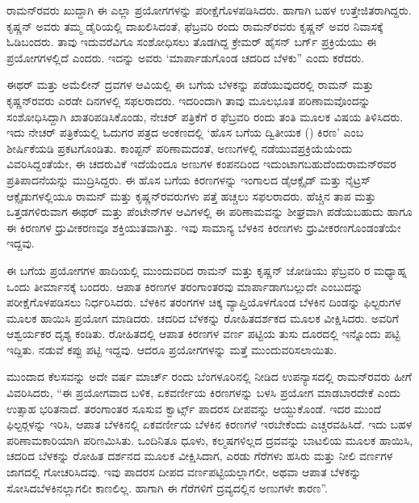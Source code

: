ರಾಮನ್‍ರವರು ಖುದ್ದಾಗಿ ಈ ಎಲ್ಲಾ ಪ್ರಯೋಗಗಳನ್ನು ಪರೀಕ್ಷೆಗೊಳಪಡಿಸಿದರು. ಹಾಗಾಗಿ ಬಹಳ ಉತ್ತೇಜಿತರಾಗಿದ್ದರು. ಕೃಷ್ಣನ್ ಅವರು ತಮ್ಮ ಡೈರಿಯಲ್ಲಿ ದಾಖಲಿಸಿದಂತೆ, ಫೆಬ್ರವರಿ  ರಂದು ರಾಮನ್‍ರವರು ಕೃಷ್ಣನ್ ಅವರ ನಿವಾಸಕ್ಕೆ ಓಡಿಬಂದರು. ತಾವು ಇದುವರೆವಿಗೂ ಸಂಶೋಧಿಸಲು ತೊಡಗಿದ್ದ ಕ್ರೇಮರ್ ಹೈಸನ್ ಬರ್ಗ್ ಪ್ರಕ್ರಿಯೆಯು ಈ ಪ್ರಯೋಗಗಳಲ್ಲಿದೆ ಎಂದರು. ಇದನ್ನು ಅವರು ‘ಮಾರ್ಪಾಡುಗೊಂಡ ಚದರಿದ ಬೆಳಕು” ಎಂದು ಕರೆದರು.

ಈಥರ್ ಮತ್ತು ಅಮೆಲೀನ್ ದ್ರವಗಳ ಆವಿಯಲ್ಲಿ ಈ ಬಗೆಯ ಬೆಳಕನ್ನು ಪಡೆಯುವುದರಲ್ಲಿ ರಾಮನ್ ಮತ್ತು ಕೃಷ್ಣನ್‍ರವರು ಎರಡೇ ದಿನಗಳಲ್ಲಿ ಸಫಲರಾದರು. ಇದರಿಂದಾಗಿ ತಾವು ಮೂಲಭೂತ ಪರಿಣಾಮವೊಂದನ್ನು ಸಂಶೋಧಿಸಿದ್ದಾಗಿ ಖಾತರಿಪಡಿಸಿಕೊಂಡು, ನೇಚರ್ ಪತ್ರಿಕೆಗೆ ರ ಫೆಬ್ರವರಿ ರಂದು ತಂತಿ ಮೂಲಕ ವಿಷಯ ತಿಳಿಸಿದರು. ಇದು ನೇಚರ್ ಪತ್ರಿಕೆಯಲ್ಲಿ ಓದುಗರ ಪತ್ರದ ಅಂಕಣದಲ್ಲಿ ‘ಹೊಸ ಬಗೆಯ ದ್ವಿತೀಯಕ () ಕಿರಣ’ ಎಂಬ ಶೀರ್ಷಿಕೆಯಡಿ ಪ್ರಕಟಗೊಂಡಿತು. ಕಾಂಪ್ಟನ್ ಪರಿಣಾಮದಂತೆ, ಅಣುಗಳಲ್ಲಿ ನಡೆಯುವ\break ಪ್ರಕ್ರಿಯೆಯೆಂದು ವಿವರಿಸಿದ್ದಂತೆಯೇ, ಈ ಚದರುವಿಕೆ ಇದೆಯೆಂದೂ ಅಣುಗಳ ಕಂಪನದಿಂದ ಇದುಂಟಾಗಬಹುದೆಂದು\enginline{-}ರಾಮನ್‍ರವರ ಪ್ರತಿಪಾದನೆಯನ್ನು ಮುದ್ರಿಸಿದ್ದರು. ಈ ಹೊಸ ಬಗೆಯ ಕಿರಣಗಳನ್ನು ಇಂಗಾಲದ ಡೈಆಕ್ಸೈಡ್ ಮತ್ತು ನೈಟ್ರಸ್ ಆಕ್ಸೈಡುಗಳಲ್ಲಿಯೂ ರಾಮನ್ ಮತ್ತು ಕೃಷ್ಣನ್‍ರವರುಗಳು ಪತ್ತೆ ಹಚ್ಚಲು ಸಫಲರಾದರು. ಹೆಚ್ಚಿನ ತಾಪ ಮತ್ತು ಒತ್ತಡಗಳಿರುವಾಗ ಈಥರ್ ಮತ್ತು ಪೆಂಟೇನ್‍ಗಳ ಆವಿಗಳಲ್ಲಿ ಈ ಪರಿಣಾಮವನ್ನು ಶೀಘ್ರವಾಗಿ ಪಡೆಯಬಹುದು ಹಾಗೂ ಈ ಕಿರಣಗಳ ಧ್ರುವೀಕರಣವೂ ಶಕ್ತಿಯುತವಾಗಿತ್ತು. ಇವು ಸಾಮಾನ್ಯ ಬೆಳಕಿನ ಕಿರಣಗಳು ಧ್ರುವೀಕರಣಗೊಂಡಂತೆಯೇ ಇದ್ದವು.

ಈ ಬಗೆಯ ಪ್ರಯೋಗಗಳ ಹಾದಿಯಲ್ಲಿ ಮುಂದುವರಿದ ರಾಮನ್ ಮತ್ತು ಕೃಷ್ಣನ್ ಜೋಡಿಯು  ಫೆಬ್ರವರಿ ರ ಮಧ್ಯಾಹ್ನ ಒಂದು ತೀರ್ಮಾನಕ್ಕೆ ಬಂದರು. ಆಪಾತ ಕಿರಣಗಳ ತರಂಗಾಂತರವು ಮಾರ್ಪಾಡಾಗಬಲ್ಲುದೇ ಎಂಬುದನ್ನು ಪರೀಕ್ಷೆಗೊಳಪಡಿಸಲು ನಿರ್ಧರಿಸಿದರು. ಬೆಳಕಿನ ತರಂಗಗಳ ಚಿಕ್ಕ ವ್ಯಾಪ್ತಿಯೊಳಗೊಂಡ ಬೆಳಕಿನ ದಿಂಡನ್ನು ಫಿಲ್ಟರುಗಳ ಮೂಲಕ ಹಾಯಿಸಿ ಪ್ರಯೋಗ ಮಾಡಿದರು. ಚದರಿದ ಬೆಳಕನ್ನು ರೋಹಿತದರ್ಶಕದ ಮೂಲಕ ವೀಕ್ಷಿಸಿದರು. ಅವರಿಗೆ ಆಶ್ವರ್ಯಕರ ದೃಶ್ಯ ಕಂಡಿತು. ರೋಹಿತದಲ್ಲಿ ಆಪಾತ ಕಿರಣಗಳ ವರ್ಣ ಪಟ್ಟಿಯ ತುಸು ದೂರದಲ್ಲಿ ಇನ್ನೊಂದು ಪಟ್ಟಿ ಇದ್ದಿತು. ನಡುವೆ ಕಪ್ಪು ಪಟ್ಟಿ ಇದ್ದವು. ಆದರೂ ಪ್ರಯೋಗಗಳನ್ನು ಮತ್ತೆ ಮುಂದುವರಿಸಲಾಯಿತು.

ಮುಂದಾದ ಕೆಲಸವನ್ನು ಅದೇ ವರ್ಷ ಮಾರ್ಚ್  ರಂದು ಬೆಂಗಳೂರಿನಲ್ಲಿ ನೀಡಿದ ಉಪನ್ಯಾಸದಲ್ಲಿ ರಾಮನ್‍ರವರು ಹೀಗೆ ವಿವರಿಸಿದರು, “ಈ ಪ್ರಯೋಗವಾದ ಬಳಿಕ, ಏಕವರ್ಣೀಯ ಕಿರಣಗಳನ್ನು ಬಳಸಿ ಪ್ರಯೋಗ ಮಾಡಬಾರದೇಕೆ ಎಂದು ಉತ್ಸಾಹ ಭರಿತನಾದೆ.  ತರಂಗಾಂತರ ಸೂಸುವ ಕ್ವಾರ್ಟ್ಸ್ ಪಾದರಸ ದೀಪವನ್ನು ಆಯ್ದುಕೊಂಡೆ. ಇದರ ಮುಂದೆ ಫಿಲ್ಟರ್‍ಗಳನ್ನು ಇರಿಸಿ, ಆಪಾತ ಬೆಳಕಿನಲ್ಲಿ ಏಕವರ್ಣೀಯ ಬೆಳಕಿನ ಕಿರಣಗಳೆ ಇರಬೇಕೆಂದು ಎಚ್ಚರವಹಿಸಿದೆ. ಇದು ಬಹಳ ಪರಿಣಾಮಕಾರಿಯಾಗಿ ಪರಿಣಮಿಸಿತು. ಒಂದಿನಿತೂ ಧೂಳು, ಕಲ್ಮಷಗಳಿಲ್ಲದ ದ್ರವವನ್ನು ಬಾಟಲಿಯ ಮೂಲಕ ಹಾಯಿಸಿ, ಚದರಿದ ಬೆಳಕನ್ನು ರೋಹಿತ ದರ್ಶನದ ಮೂಲಕ ವೀಕ್ಷಿಸಿದಾಗ, ಎರಡು ಗೆರೆಗಳು ಹಸಿರು ಮತ್ತು ನೀಲಿ ವರ್ಣಗಳ ಜಾಗದಲ್ಲಿ ಗೋಚರಿಸಿದವು. ಇವು ಪಾದರಸ ದೀಪದ ವರ್ಣಪಟ್ಟಿಯಲ್ಲಾಗಲೀ, ಅಥವಾ ಆಪಾತ ಬೆಳಕನ್ನು ಸೋಸಿದ\break ಬೆಳಕಿನಲ್ಲಾಗಲೀ ಕಾಣಲಿಲ್ಲ. ಹಾಗಾಗಿ ಈ ಗೆರೆಗಳಿಗೆ ದ್ರವ್ಯದಲ್ಲಿನ ಅಣುಗಳೇ ಕಾರಣ”.

